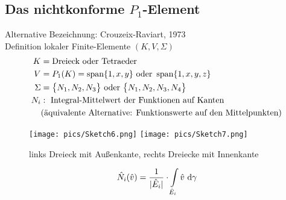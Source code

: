 \subsection{Das nichtkonforme \texorpdfstring{$P_1$}{P\_1}-Element}
Alternative Bezeichnung: Crouzeix-Raviart, 1973\\
Definition lokaler Finite-Elemente $(K,V,\Sigma)$
\begin{align*}
	K&=\text{Dreieck oder Tetraeder}\\
	V&=P_1(K)=\operatorname{span}\{1,x,y\}\text{ oder }\operatorname{span}\{1,x,y,z\}\\
	\Sigma&=\big\{N_1,N_2,N_3\big\}\text{ oder }\big\lbrace N_1,N_2,N_3,N_4\big\rbrace\\
	N_i&:\text{ Integral-Mittelwert der Funktionen auf Kanten}\\
	&\text{(äquivalente Alternative: Funktionswerte auf den Mittelpunkten)}
\end{align*}

\begin{beisp}\enter
	\begin{figure}[!ht]
		\begin{center}
			\texttt{[image: pics/Sketch6.png]}
			\texttt{[image: pics/Sketch7.png]}
			\caption{links Dreieck mit Außenkante, rechts Dreiecke mit Innenkante}
			\label{AbbKantentypen}
		\end{center}
	\end{figure}
	\begin{align*}
		\hat{N}_i(\hat{v})=\frac{1}{|\hat{E}_i|}\cdot\int\limits_{\hat{E}_i}\hat{v}\text{ d}\gamma
	\end{align*}
\end{beisp}

